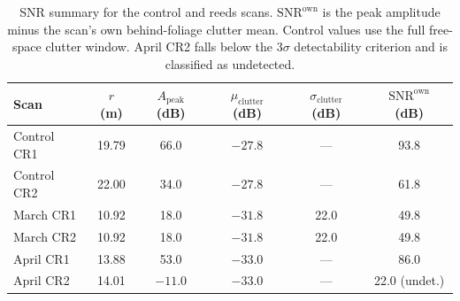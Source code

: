 \begin{table}[H]
    \centering
    \renewcommand{\arraystretch}{1.15}
    \begin{tabular}{lccccc}
        \hline
        \textbf{Scan} & $r$ (m) & $A_{\mathrm{peak}}$ (dB) &
        $\mu_{\mathrm{clutter}}$ (dB) & $\sigma_{\mathrm{clutter}}$ (dB) &
        $\mathrm{SNR}^{\mathrm{own}}$ (dB) \\
        \hline
        Control CR1       & 19.79 & 66.0  & $-27.8$ & ---   & 93.8  \\
        Control CR2       & 22.00 & 34.0  & $-27.8$ & ---   & 61.8  \\
        March CR1         & 10.92 & 18.0  & $-31.8$ & 22.0  & 49.8  \\
        March CR2         & 10.92 & 18.0  & $-31.8$ & 22.0  & 49.8  \\
        April CR1         & 13.88 & 53.0  & $-33.0$ & ---   & 86.0  \\
        April CR2         & 14.01 & $-11.0$ & $-33.0$ & --- & 22.0 (undet.) \\
        \hline
    \end{tabular}
    \caption{SNR summary for the control and reeds scans.
    $\mathrm{SNR}^{\mathrm{own}}$ is the peak amplitude minus the scan's own
    behind-foliage clutter mean.
    Control values use the full free-space clutter window.
    April CR2 falls below the $3\sigma$ detectability criterion and is
    classified as undetected.}
    \label{tab:reeds_snr}
\end{table}


%
%
%
%

